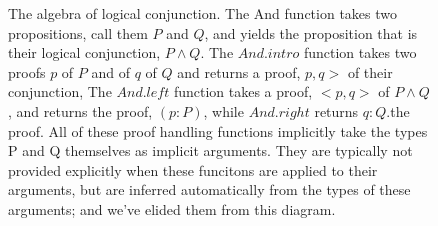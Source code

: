 \documentclass[letterpaper]{article}
\begin{document}
\begin{figure}[h!]
\caption{The algebra of logical conjunction. The And function takes two propositions, call them $P$ and $Q$, 
and yields the proposition that is their logical conjunction, $P \land Q$. The $And.intro$ function takes
two proofs $p$ of $P$ and of $q$ of $Q$ and returns a proof, $p, q>$ of their conjunction, The $And.left$
function takes a  proof, $<p, q>$ of $P \land Q$, and returns the proof, $(p : P)$, while $And.right$ returns 
$q : Q$.the proof. All of these proof handling functions implicitly take the types P and Q themselves as 
implicit arguments. They are typically not provided explicitly when these funcitons are applied to their 
arguments, but are inferred automatically from the types of these arguments; and we've elided them from
this diagram.}
\label{fig:tikz_diagram_definitive}
\end{figure}
\end{document}
